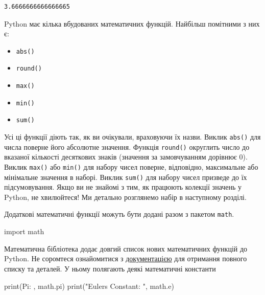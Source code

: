 \documentclass[
  letterpaper,
]{report}
\newenvironment{Shaded}{\begin{snugshade}}{\end{snugshade}}
\newcommand{\BuiltInTok}[1]{\textcolor[rgb]{0.00,0.23,0.31}{#1}}
\newcommand{\ImportTok}[1]{\textcolor[rgb]{0.00,0.46,0.62}{#1}}
\newcommand{\NormalTok}[1]{\textcolor[rgb]{0.00,0.23,0.31}{#1}}
\newcommand{\StringTok}[1]{\textcolor[rgb]{0.13,0.47,0.30}{#1}}
\providecommand{\tightlist}{%
  \setlength{\itemsep}{0pt}\setlength{\parskip}{0pt}}\usepackage{longtable,booktabs,array}
\begin{document}
\begin{verbatim}
3.6666666666666665
\end{verbatim}

Python має кілька вбудованих математичних функцій. Найбільш помітними з
них є:

\begin{itemize}
\tightlist
\item
  \texttt{abs()}
\item
  \texttt{round()}
\item
  \texttt{max()}
\item
  \texttt{min()}
\item
  \texttt{sum()}
\end{itemize}

Усі ці функції діють так, як ви очікували, враховуючи їх назви. Виклик
\texttt{abs()} для числа поверне його абсолютне значення. Функція
\texttt{round()} округлить число до вказаної кількості десяткових знаків
(значення за замовчуванням дорівнює \(0\)). Виклик \texttt{max()} або
\texttt{min()} для набору чисел поверне, відповідно, максимальне або
мінімальне значення в наборі. Виклик \texttt{sum()} для набору чисел
призведе до їх підсумовування. Якщо ви не знайомі з тим, як працюють
колекції значень у Python, не хвилюйтеся! Ми детально розглянемо набір в
наступному розділі.

Додаткові математичні функції можуть бути додані разом з пакетом
\texttt{math}.

\begin{Shaded}
\begin{Highlighting}[]
\ImportTok{import}\NormalTok{ math}
\end{Highlighting}
\end{Shaded}

Математична бібліотека додає довгий список нових математичних функцій до
Python. Не соромтеся ознайомитися з
\href{https://docs.python.org/3/library/math.html}{документацією} для
отримання повного списку та деталей. У ньому полягають деякі математичні
константи

\begin{Shaded}
\begin{Highlighting}[]
\BuiltInTok{print}\NormalTok{(}\StringTok{\textquotesingle{}Pi: \textquotesingle{}}\NormalTok{, math.pi)}
\BuiltInTok{print}\NormalTok{(}\StringTok{"Euler\textquotesingle{}s Constant: "}\NormalTok{, math.e)}
\end{Highlighting}
\end{Shaded}
\end{document}
